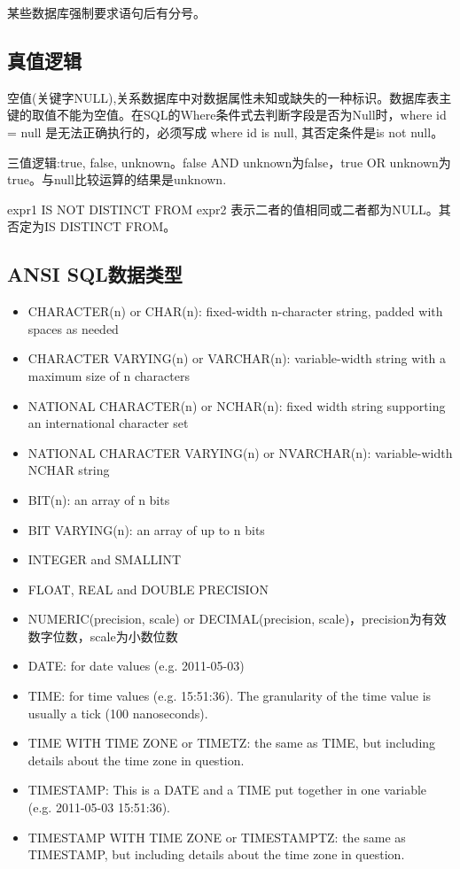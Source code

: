 某些数据库强制要求语句后有分号。

\subsection{真值逻辑}

空值(关键字NULL),关系数据库中对数据属性未知或缺失的一种标识。数据库表主键的取值不能为空值。在SQL的Where条件式去判断字段是否为Null时，where id = null 是无法正确执行的，必须写成 where id is null, 其否定条件是is not null。

三值逻辑:true, false, unknown。false AND unknown为false，true OR unknown为true。与null比较运算的结果是unknown.

expr1 IS NOT DISTINCT FROM expr2 表示二者的值相同或二者都为NULL。其否定为IS DISTINCT FROM。


\subsection{ANSI SQL数据类型}
\begin{itemize}
   \item 
 CHARACTER(n) or CHAR(n): fixed-width n-character string, padded with spaces as needed
   \item 
CHARACTER VARYING(n) or VARCHAR(n): variable-width string with a maximum size of n characters
   \item 
NATIONAL CHARACTER(n) or NCHAR(n): fixed width string supporting an international character set
   \item 
NATIONAL CHARACTER VARYING(n) or NVARCHAR(n): variable-width NCHAR string
   \item 
BIT(n): an array of n bits
   \item 
BIT VARYING(n): an array of up to n bits
   \item 
INTEGER and SMALLINT
   \item 
FLOAT, REAL and DOUBLE PRECISION
   \item 
NUMERIC(precision, scale) or DECIMAL(precision, scale)，precision为有效数字位数，scale为小数位数
   \item 
DATE: for date values (e.g. 2011-05-03)
   \item 
TIME: for time values (e.g. 15:51:36). The granularity of the time value is usually a tick (100 nanoseconds).
   \item 
TIME WITH TIME ZONE or TIMETZ: the same as TIME, but including details about the time zone in question.
   \item 
TIMESTAMP: This is a DATE and a TIME put together in one variable (e.g. 2011-05-03 15:51:36).
   \item 
TIMESTAMP WITH TIME ZONE or TIMESTAMPTZ: the same as TIMESTAMP, but including details about the time zone in question.
\end{itemize}





